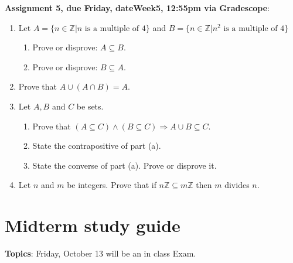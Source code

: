 \documentclass[12pt]{article}
\newcommand{\HWdueTime}{12:55pm }
\newcommand{\Z}{{\mathbb Z}}
\begin{document}
\smallskip
\noindent \textbf{Assignment 5, due Friday, \csname dateWeek5\endcsname, \HWdueTime via Gradescope}:
\begin{enumerate}
\item Let $A = \{ n \in \Z | n \text{ is a multiple of } 4\}$ and $B = \{ n \in \Z | n^2 \text{ is a multiple of } 4\}$ 
 \begin{enumerate}
 \item Prove or disprove: $A \subseteq B$. 
 \item Prove or disprove: $B \subseteq A$. 
 \end{enumerate}

\item Prove that $A \cup (A \cap B) = A.$
\item Let $A,B$ and $C$ be sets. 
 \begin{enumerate}
 \item Prove that $(A \subseteq C) \wedge (B \subseteq C) \Rightarrow A \cup B \subseteq C$.
 \item State the contrapositive of part (a).
 \item State the converse of part (a). Prove or disprove it.
 \end{enumerate}
\item Let $n$ and $m$ be integers. Prove that if $n\Z \subseteq m\Z$ then $m$ divides $n$.
\end{enumerate}


\newpage
\section[ (October 13) Midterm]{Midterm study guide}

\textbf{Topics}: Friday, October 13 will be an in class Exam.
\\
\end{document}
